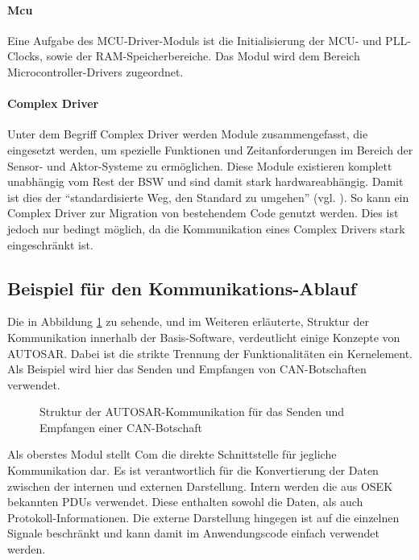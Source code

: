 \documentclass[
  a4paper,					    %
  twoside,
  DIV=calc,     				%
  bibliography=totoc,
  cleardoublepage=empty,
  ngerman,     					%
  final       					%
]{scrbook}
\begin{document}
\paragraph{Mcu}
Eine Aufgabe des MCU-Driver-Moduls ist die Initialisierung der MCU- und PLL-Clocks, sowie der RAM-Speicherbereiche. Das Modul wird dem Bereich Microcontroller-Drivers zugeordnet.

\paragraph{Complex Driver}
Unter dem Begriff Complex Driver werden Module zusammengefasst, die eingesetzt werden, um spezielle Funktionen und Zeitanforderungen im Bereich der Sensor- und Aktor-Systeme zu ermöglichen. Diese Module existieren komplett unabhängig vom Rest der BSW und sind damit stark hardwareabhängig. Damit ist dies der "`standardisierte Weg, den Standard zu umgehen"' (vgl. \cite[Seite 227]{SE_Autosar}). So kann ein Complex Driver zur Migration von bestehendem Code genutzt werden. Dies ist jedoch nur bedingt möglich, da die Kommunikation eines Complex Drivers stark eingeschränkt ist.


\subsection{Beispiel für den Kommunikations-Ablauf}
\label{sec:beispiel_komm}
Die in Abbildung \ref{fig:komm_beispiel} zu sehende, und im Weiteren erläuterte, Struktur der Kommunikation innerhalb der Basis-Software, verdeutlicht einige Konzepte von AUTOSAR. Dabei ist die strikte Trennung der Funktionalitäten ein Kernelement. Als Beispiel wird hier das Senden und Empfangen von CAN-Botschaften verwendet.

\begin{figure}[ht]
    \centering
    
    \caption[Struktur der AUTOSAR-Kommunikation]{Struktur der AUTOSAR-Kommunikation für das Senden und Empfangen einer CAN-Botschaft}
    \label{fig:komm_beispiel}
\end{figure}

Als oberstes Modul stellt Com die direkte Schnittstelle für jegliche Kommunikation dar. Es ist verantwortlich für die Konvertierung der Daten zwischen der internen und externen Darstellung. Intern werden die aus OSEK bekannten PDUs verwendet. Diese enthalten sowohl die Daten, als auch Protokoll-Informationen. Die externe Darstellung hingegen ist auf die einzelnen Signale beschränkt und kann damit im Anwendungscode einfach verwendet werden.
\end{document}

